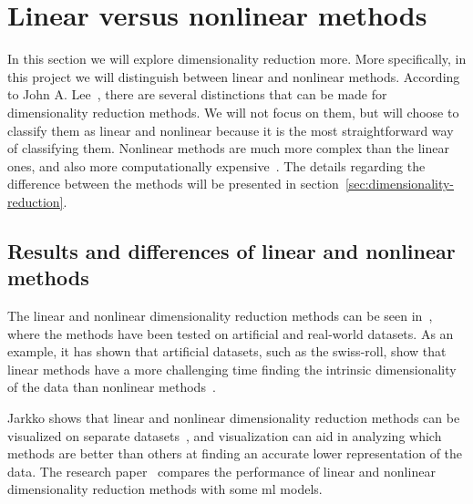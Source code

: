 \section{Linear versus nonlinear methods}\label{sec:linear-vs-nonlinear} 

In this section we will explore dimensionality reduction more. More specifically, in this project we will distinguish between linear and nonlinear methods. According to John A. Lee~\cite{nonlinear-dim-red-chapter-two}, there are several distinctions that can be made for dimensionality reduction methods. We will not focus on them, but will choose to classify them as linear and nonlinear because it is the most straightforward way of classifying them. Nonlinear methods are much more complex than the linear ones, and also more computationally expensive~\cite{nonlinear-dim-red-chapter-two}. The details regarding the difference between the methods will be presented in section~\ref{sec:dimensionality-reduction}.


\subsection{Results and differences of linear and nonlinear methods}

The linear and nonlinear dimensionality reduction methods can be seen in~\cite{dimensionality-reduction-comparative-review, tennenbaum}, where the methods have been tested on artificial and real-world datasets. As an example, it has shown that artificial datasets, such as the swiss-roll, show that linear methods have a more challenging time finding the intrinsic dimensionality of the data than nonlinear methods~\cite{tennenbaum}.

Jarkko shows that linear and nonlinear dimensionality reduction methods can be visualized on separate datasets~\cite{dim-red-visual}, and visualization can aid in analyzing which methods are better than others at finding an accurate lower representation of the data. The research paper~\cite{dimensionality-reduction-comparative-review} compares the performance of linear and nonlinear dimensionality reduction methods with some \gls{ml} models.

